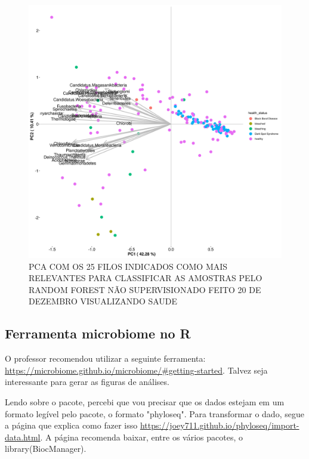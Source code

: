 \documentclass[12pt, a4paper]{report}
\begin{document}
\begin{figure}[H]
	\centering
	\includegraphics[scale=0.4]{figures/PCA_rf_nao_super_25_157_corais_health_2018_12_20.png}
	\caption{PCA COM OS 25 FILOS INDICADOS COMO MAIS RELEVANTES PARA CLASSIFICAR AS AMOSTRAS PELO RANDOM FOREST NÃO SUPERVISIONADO FEITO 20 DE DEZEMBRO VISUALIZANDO SAUDE}
	\label{fig: PCA COM OS 25 FILOS INDICADOS COMO MAIS RELEVANTES PARA CLASSIFICAR AS AMOSTRAS PELO RANDOM FOREST NÃO SUPERVISIONADO FEITO 20 DE DEZEMBRO VISUALIZANDO SAUDE DE CORAIS}
\end{figure}






\subsection{Ferramenta microbiome no R}
O professor recomendou utilizar a seguinte ferramenta: \url{https://microbiome.github.io/microbiome/#getting-started}. Talvez seja interessante para gerar as figuras de análises.

Lendo sobre o pacote, percebi que vou precisar que os dados estejam em um formato legível pelo pacote, o formato "phyloseq". Para transformar o dado, segue a página que explica como fazer isso \url{https://joey711.github.io/phyloseq/import-data.html}.
A página recomenda baixar, entre os vários pacotes, o library(BiocManager). 
\end{document}
